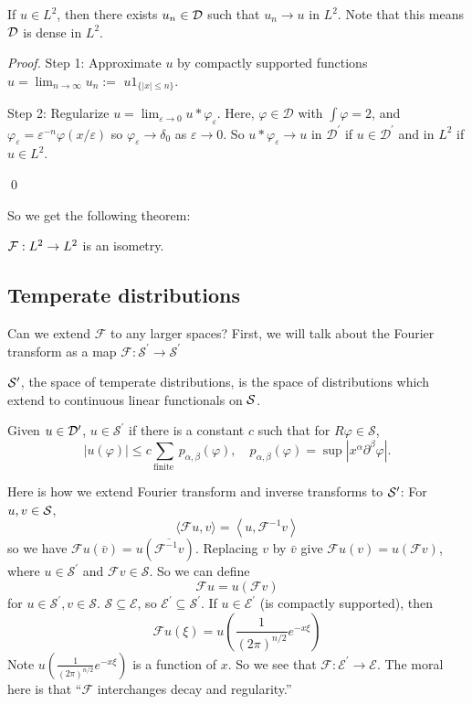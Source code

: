 \begin{proposition}
If $u\in L^2$, then there exists $u_n\in \mathcal{D}$ such that $u_n\to u$ in $L^2$. Note that this means $\mathcal{D}$ is dense in $L^2$.
\end{proposition}

\begin{proof}
    Step 1: Approximate $u$ by compactly supported functions $u=\lim _{n \rightarrow \infty} u_{n}:=$ $u 1_{\{|x| \leq n\}} .$

Step 2: Regularize $u=\lim _{\varepsilon \rightarrow 0} u * \varphi_\varepsilon .$ Here, $\varphi \in \mathcal{D}$ with  $\int \varphi=2$, and $\varphi_{\varepsilon}=\varepsilon^{-n} \varphi(x / \varepsilon)$ so $\varphi_{\varepsilon} \rightarrow \delta_{0}$ as $\varepsilon \rightarrow 0 .$ So $u * \varphi_{\varepsilon} \rightarrow u$ in $\mathcal{D}^{\prime}$ if $u \in \mathcal{D}^{\prime}$ and in $L^{2}$ if $u \in L^{2}$.

\qed 
\end{proof}

So we get the following theorem: 
\begin{theorem}
[Plancherel]
$\mathcal{F}:L^2 \to L^2$ is an isometry.
\end{theorem}

\subsection{Temperate distributions}
Can we extend $\mathcal{F}$ to any larger spaces? First, we will talk about the Fourier transform as a map $\mathcal{F}: \mathcal{S}^{\prime} \rightarrow \mathcal{S}^{\prime}$

\begin{definition}
$\mathcal{S}'$, the space of temperate distributions, is the space of distributions which extend to continuous linear functionals on $\mathcal{S}$. 

Given $u\in \mathcal{D}'$, $u \in \mathcal{S}^{\prime}$ if there is a constant $c$ such that for $R \varphi \in \mathcal{S}$,
$$
|u(\varphi)| \leq c \sum_{\text {finite }} p_{\alpha, \beta}(\varphi), \quad p_{\alpha, \beta}(\varphi)=\sup \left|x^{\alpha} \partial^{\beta} \varphi\right| .
$$
\end{definition}

Here is how we extend Fourier transform and inverse transforms to $\mathcal{S}'$: For $u,v\in \mathcal{S}$,
$$
\langle\mathcal{F} u, v\rangle=\left\langle u, \mathcal{F}^{-1} v\right\rangle
$$
so we have $\mathcal{F} u(\bar{v})=u\left(\overline{\mathcal{F}^{-1} v}\right)$. Replacing $v$ by $\bar{v}$ give $\mathcal{F} u(v)=u(\mathcal{F} v)$, where $u \in \mathcal{S}^{\prime}$ and $\mathcal{F} v \in \mathcal{S}$. So we can define
$$
\mathcal{F} u=u(\mathcal{F} v)
$$
for $u \in \mathcal{S}^{\prime}, v \in \mathcal{S}$.
$\mathcal{S} \subseteq \mathcal{E}$, so $\mathcal{E}^{\prime} \subseteq \mathcal{S}^{\prime} .$ If $u \in \mathcal{E}^{\prime}$ (is compactly supported), then
$$
\mathcal{F} u(\xi)=u\left(\frac{1}{(2 \pi)^{n / 2}} e^{-x \xi}\right)
$$
Note $u\left(\frac{1}{(2 \pi)^{n / 2}} e^{-x \xi}\right)$ is a function of $x$. So we see that $\mathcal{F}: \mathcal{E}^{\prime} \rightarrow \mathcal{E}$. The moral here is that ``$\mathcal{F}$ interchanges decay and regularity.''

